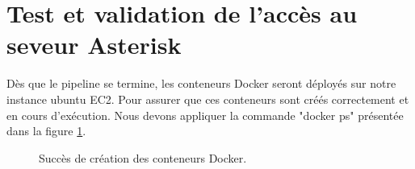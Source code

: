 \section{Test et validation de l'accès au seveur Asterisk}
Dès que le pipeline se termine, les conteneurs Docker seront déployés sur notre instance ubuntu EC2. Pour assurer que ces conteneurs sont créés correctement et en cours d'exécution. Nous devons appliquer la commande "docker ps" présentée dans la figure \ref{fig:ps}.
\begin{figure}[H]
        \centering
        \caption{Succès de création des conteneurs Docker.}
        \label{fig:ps}
\end{figure}

